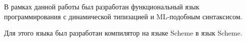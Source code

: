 \conclusiontitle
    В рамках данной работы был разработан функциональный язык программирования с динамической типизацией и ML-подобным синтаксисом.

    Для этого языка был разработан компилятор на языке Scheme в язык Scheme.

    